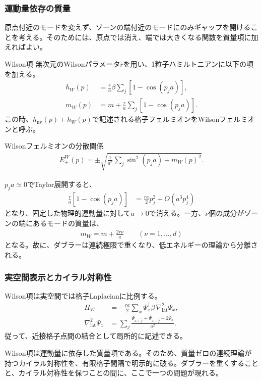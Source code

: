\documentclass[a4paper,10.5pt]{article}
\numberwithin{equation}{section}
\providecommand{\nv}{\mathrm{nv}}
\begin{document}
\subsubsection{運動量依存の質量}
原点付近のモードを変えず、ゾーンの端付近のモードにのみギャップを開けることを考える。そのためには、原点では消え、端では大きくなる関数を質量項に加えればよい。
\begin{defbox}{Wilson項}
無次元のWilsonパラメータ$r$を用い、1粒子ハミルトニアンに以下の項を加える。
\begin{align}
h_W(p)&=\frac r a\beta\sum_j[1-\cos(p_ja)],\\
m_W(p)&=m+\frac r a\sum_j[1-\cos(p_ja)].
\end{align}
この時、$h_{\nv}(p)+h_W(p)$で記述される格子フェルミオンをWilsonフェルミオンと呼ぶ。
\end{defbox}
\begin{resultbox}{Wilsonフェルミオンの分散関係}
\begin{align}
E_\pm^W(p)=\pm\sqrt{\frac1{a^2}\sum_j\sin^2(p_ja)+m_W(p)^2}.
\end{align}
\end{resultbox}
$p_ja\simeq0$でTaylor展開すると、
\begin{align}
\frac r a[1-\cos(p_ja)]&=\frac{ra}{2}p_j^2+O(a^3p_j^4)
\end{align}
となり、固定した物理的運動量に対して$a\to0$で消える。一方、$\nu$個の成分がゾーンの端にあるモードの質量は、
\begin{align}
m_W=m+\frac{2r\nu}{a}\qquad(\nu=1,\ldots,d)
\end{align}
となる。故に、ダブラーは連続極限で重くなり、低エネルギーの理論から分離される。

\subsubsection{実空間表示とカイラル対称性}
Wilson項は実空間では格子Laplacianに比例する。
\begin{align}
H_W&=-\frac{ra}{2}\sum_x\Psi_x^\dagger\beta\,\nabla_{\mathrm{lat}}^2\Psi_x,\\
\nabla_{\mathrm{lat}}^2\Psi_x
&=\sum_j\frac{\Psi_{x+\hat j}+\Psi_{x-\hat j}-2\Psi_x}{a^2}.
\end{align}
従って、近接格子点間の結合として局所的に記述できる。
\begin{remarkbox}
Wilson項は運動量に依存した質量項である。そのため、質量ゼロの連続理論が持つカイラル対称性を、有限格子間隔で明示的に破る。ダブラーを重くすることと、カイラル対称性を保つことの間に、ここで一つの問題が現れる。
\end{remarkbox}
\end{document}

